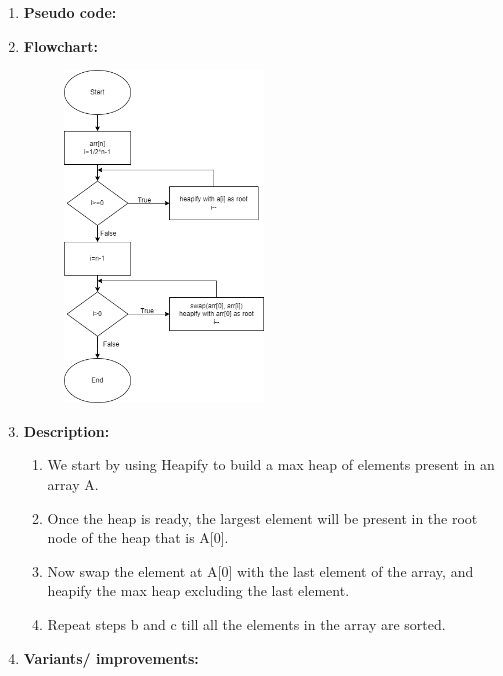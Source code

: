 \documentclass[11pt,a4paper]{article}
\begin{document}
{\begin{enumerate}[label=\textbf{\arabic*})]
					Heapsort is an in-place sorting method, i.e., no additional memory space is required except for loop and auxiliary variables. The number of these variables is always the same. Therefore the space complexity of heapsort is O(1).
				\\[12pt]
				\item \textbf{Pseudo code:} 
				\pagebreak
				\item \textbf{Flowchart:}
					\begin{figure}[H]
						\centering 
						\includegraphics[width=0.5\textwidth]{HeapSort Flowchart}
					\end{figure}
					
				\item \textbf{Description:}
					\begin{enumerate}
						\item We start by using Heapify to build a max heap of elements present in an array A.
						\item Once the heap is ready, the largest element will be present in the root node of the heap that is A[0].
						\item Now swap the element at A[0] with the last element of the array, and heapify the max heap excluding the last element.
						\item Repeat steps b and c till all the elements in the array are sorted.
					\end{enumerate}
				\item \textbf{Variants/ improvements:}
				

\end{enumerate}}
\end{document}
